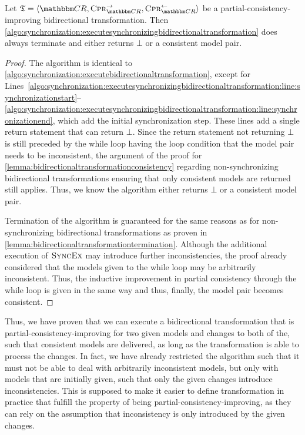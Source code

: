 \begin{theorem}
    \label{theorem:synchronizingbidirectionaltransformationconsistencytermination}
    Let $\transformation{T} = \tupled{\consistencyrelationset{CR}, \consistencypreservationrule{\consistencyrelationset{CR}}^{\rightarrow}, \consistencypreservationrule{\consistencyrelationset{CR}}^{\leftarrow}}$ be a partial-consistency-improving bidirectional transformation.
    Then \autoref{algo:synchronization:executesynchronizingbidirectionaltransformation} does always terminate and either returns $\bot$ or a consistent model pair.
\end{theorem}
\begin{proof}
    The algorithm is identical to \autoref{algo:synchronization:executebidirectionaltransformation}, except for Lines~\ref{algo:synchronization:executesynchronizingbidirectionaltransformation:line:synchronizationstart}--\ref{algo:synchronization:executesynchronizingbidirectionaltransformation:line:synchronizationend}, which add the initial synchronization step.
    These lines add a single return statement that can return $\bot$.
    Since the return statement not returning $\bot$ is still preceded by the while loop having the loop condition that the model pair needs to be inconsistent, the argument of the proof for \autoref{lemma:bidirectionaltransformationconsistency} regarding non-synchronizing bidirectional transformations ensuring that only consistent models are returned still applies.
    Thus, we know the algorithm either returns $\bot$ or a consistent model pair.

    Termination of the algorithm is guaranteed for the same reasons as for non-synchronizing bidirectional transformations as proven in \autoref{lemma:bidirectionaltransformationtermination}.
    Although the additional execution of $\textsc{SyncEx}$ may introduce further inconsistencies, the proof already considered that the models given to the while loop may be arbitrarily inconsistent.
    Thus, the inductive improvement in partial consistency through the while loop is given in the same way and thus, finally, the model pair becomes consistent.
\end{proof}

Thus, we have proven that we can execute a bidirectional transformation that is partial-consistency-improving for two given models and changes to both of the, such that consistent models are delivered, as long as the transformation is able to process the changes.
In fact, we have already restricted the algorithm such that it must not be able to deal with arbitrarily inconsistent models, but only with models that are initially given, such that only the given changes introduce inconsistencies.
This is supposed to make it easier to define transformation in practice that fulfill the property of being partial-consistency-improving, as they can rely on the assumption that inconsistency is only introduced by the given changes.

